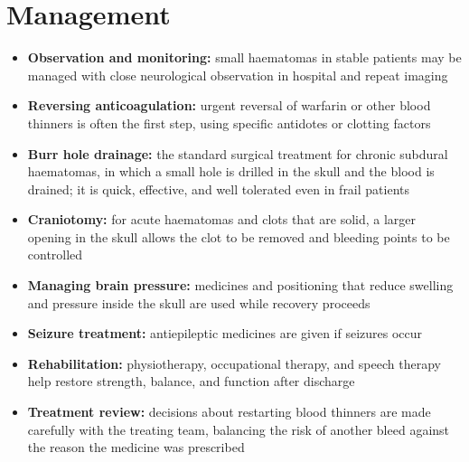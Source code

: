 \section*{Management}
\begin{itemize}
    \item \textbf{Observation and monitoring:} small haematomas in stable patients may be managed with close neurological observation in hospital and repeat imaging
    \item \textbf{Reversing anticoagulation:} urgent reversal of warfarin or other blood thinners is often the first step, using specific antidotes or clotting factors
    \item \textbf{Burr hole drainage:} the standard surgical treatment for chronic subdural haematomas, in which a small hole is drilled in the skull and the blood is drained; it is quick, effective, and well tolerated even in frail patients
    \item \textbf{Craniotomy:} for acute haematomas and clots that are solid, a larger opening in the skull allows the clot to be removed and bleeding points to be controlled
    \item \textbf{Managing brain pressure:} medicines and positioning that reduce swelling and pressure inside the skull are used while recovery proceeds
    \item \textbf{Seizure treatment:} antiepileptic medicines are given if seizures occur
    \item \textbf{Rehabilitation:} physiotherapy, occupational therapy, and speech therapy help restore strength, balance, and function after discharge
    \item \textbf{Treatment review:} decisions about restarting blood thinners are made carefully with the treating team, balancing the risk of another bleed against the reason the medicine was prescribed
\end{itemize}


